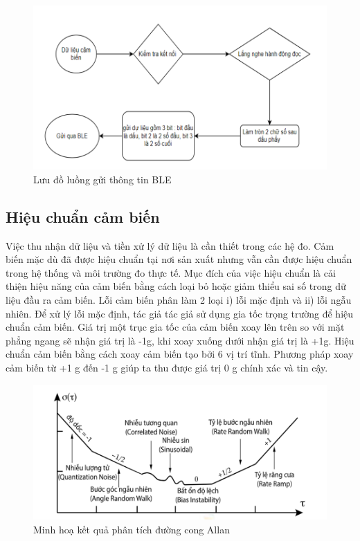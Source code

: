 \begin{figure}[!]
		\centering
 		\includegraphics[width=1\textwidth]{images/sendBleFlow.png}
		\caption{Lưu đồ luồng gửi thông tin BLE}
		\label{sendBleFlow}
\end{figure}


















\subsection{Hiệu chuẩn cảm biến}
Việc thu nhận dữ liệu và tiền xử lý dữ liệu là cần thiết trong các hệ đo. Cảm biến mặc dù đã được hiệu chuẩn tại nơi sản xuất nhưng vẫn cần được hiệu chuẩn trong hệ thống và môi trường đo thực tế. Mục đích của việc hiệu chuẩn là cải thiện hiệu năng của cảm biến bằng cách loại bỏ hoặc giảm thiểu sai số trong dữ liệu đầu ra cảm biến. Lỗi cảm biến phân làm 2 loại i) lỗi mặc định và ii) lỗi ngẫu nhiên. Để xử lý lỗi mặc định, tác giả tác giả sử dụng gia tốc trọng trường để hiệu chuẩn cảm biến. Giá trị một trục gia tốc của cảm biến xoay lên trên so với mặt phẳng ngang sẽ nhận giá trị là -1g, khi xoay xuống dưới nhận giá trị là +1g. Hiệu chuẩn cảm biến bằng cách xoay cảm biến tạo bởi 6 vị trí tĩnh. Phương pháp xoay cảm biến từ +1 g đến -1 g giúp ta thu được giá trị 0 g chính xác và tin cậy.
\begin{figure}[!]
		\centering
 		\includegraphics[width=1\textwidth]{images/allan.png}
		\caption{Minh hoạ kết quả phân tích đường cong Allan}
		\label{allan}
\end{figure}

